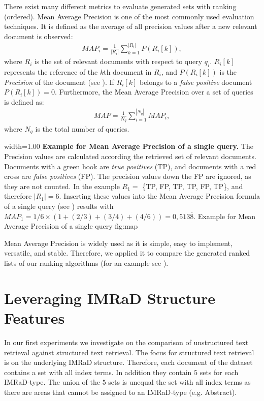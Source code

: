 There exist many different metrics to evaluate generated sets with ranking (ordered). Mean Average Precision is one of the most commonly used evaluation techniques. It is defined as the average of all precision values after a new relevant document is observed:
\begin{align}
  \label{map_of_a_single_query}
  \mathit{MAP}_i = \frac{1}{|R_i|}\sum_{k = 1}^{|R_i|} P(R_i[k]),
\end{align}
where $R_i$ is the set of relevant documents with respect to query $q_i$. $R_i[k]$ represents the reference of the $k$th document in $R_i$, and $P(R_i[k])$ is the \textit{Precision} of the document (see ). If $R_i[k]$ belongs to a \textit{false positive} document $P(R_i[k]) = 0$. Furthermore, the Mean Average Precision over a set of queries is defined as:
\begin{align}
  \mathit{MAP} = \frac{1}{N_q}\sum_{i = 1}^{|N_q|} \mathit{MAP}_i,
\end{align}
where $N_q$ is the total number of queries.

      {width=1.00\textwidth}
      {\textbf{Example for Mean Average Precision of a single query.} The Precision values are calculated according the retrieved set of relevant documents. Documents with a green hook are \textit{true positives} (TP), and documents with a red cross are \textit{false positives} (FP). The precision values down the FP are ignored, as they are not counted. In the example $R_1 =$ \{TP, FP, TP, TP, FP, TP\}, and therefore $|R_1| = 6$. Inserting these values into the Mean Average Precision formula of a single query (see ) results with $\mathit{MAP}_1 = 1/6 \times (1 + (2/3) + (3/4) + (4/6)) = 0,513\overline{8}$.}
      {Example for Mean Average Precision of a single query}
      {fig:map}

 Mean Average Precision is widely used as it is simple, easy to implement, versatile, and stable. Therefore, we applied it to compare the generated ranked lists of our ranking algorithms (for an example see ).

\section{Leveraging IMRaD Structure Features}

In our first experiments we investigate on the comparison of unstructured text retrieval against structured text retrieval. The focus for structured text retrieval is on the underlying IMRaD structure. Therefore, each document of the dataset contains a set with all index terms. In addition they contain $5$ sets for each IMRaD-type. The union of the $5$ sets is unequal the set with all index terms as there are areas that cannot be assigned to an IMRaD-type (e.g. Abstract). 


